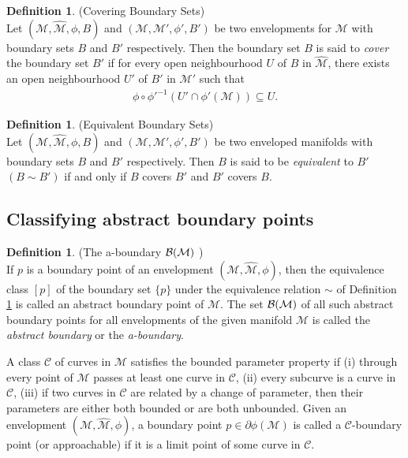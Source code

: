 \documentclass[pdflatex,sn-mathphys-num]{sn-jnl}
\theoremstyle{definition}
\newtheorem{defn}[theorem]{Definition}
\begin{document}
\begin{defn}(Covering Boundary Sets)\\
Let $(\mathcal{M},\mathcal{\hat{M}},\phi,B)$ and $(\mathcal{M},\mathcal{M}',\phi',B')$ be two envelopments for $\mathcal{M}$ with boundary sets $B$ and $B'$ respectively. Then the boundary set $B$ is said to \textit{cover} the boundary set $B'$ if for every open neighbourhood $U$ of $B$ in $\mathcal{\hat{M}}$, there exists an open neighbourhood $U'$ of $B'$ in $\mathcal{M}'$ such that
\begin{align}
    \phi \circ \phi'^{-1}(U' \cap \phi'(\mathcal{M})) \subseteq U .
\end{align}
\end{defn}

\begin{defn}(Equivalent Boundary Sets)\label{Eq}\\
Let $(\mathcal{M},\hat{\mathcal{M}},\phi,B)$ and $(\mathcal{M},\mathcal{M}',\phi',B')$ be two enveloped manifolds with boundary sets $B$ and $B'$ respectively. Then $B$ is said to be \textit{equivalent} to $B'$ $(B \sim B')$ if and only if $B$ covers $B'$ and $B'$ covers $B$.
\end{defn}
\subsection{Classifying abstract boundary points}

\begin{defn}(The a-boundary ${\cal B}(\cal M)$ )\\
If $p$ is a boundary point of an envelopment $(\mathcal{M},\hat{\mathcal{M}},\phi)$, then the equivalence class $[p]$ of the boundary set $\{p\}$ under the equivalence relation $\sim$ of Definition \ref{Eq} is called an abstract boundary point of $\mathcal{M}$. The set ${\cal B}(\cal M)$ of all such abstract boundary points for all envelopments of the given manifold $\mathcal{M}$ is called the \textit{abstract boundary} or the \textit{a-boundary}.
\end{defn}

A class $\mathcal{C}$ of curves in $\mathcal{M}$ satisfies the bounded parameter property if (i) through every point of $\mathcal{M}$ passes at least one curve in $\mathcal{C}$, (ii) every subcurve is a curve in $\mathcal{C}$, (iii) if two curves in $\mathcal{C}$ are related by a change of parameter, then their parameters are either both bounded or are both unbounded. Given an envelopment $(\mathcal{M},\hat{\mathcal{M}},\phi)$, a boundary point $p \in \partial\phi(\mathcal{M})$ is called a $\mathcal{C}$-boundary point (or approachable) if it is a limit point of some curve in $\mathcal{C}$.
\end{document}
